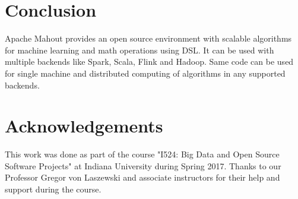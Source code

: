\documentclass[9pt,twocolumn,twoside]{../../styles/osajnl}
\begin{document}
\section{Conclusion}
Apache Mahout provides an open source environment with scalable
algorithms for machine learning and math operations using DSL. It can
be used with multiple backends like Spark, Scala, Flink and
Hadoop. Same code can be used for single machine and distributed
computing of algorithms in any supported backends.

\section*{Acknowledgements}

This work was done as part of the course "I524: Big Data and
Open Source Software Projects" at Indiana University during
Spring 2017. Thanks to our Professor Gregor von Laszewski
and associate instructors for their help and support during the
course.




\end{document}
